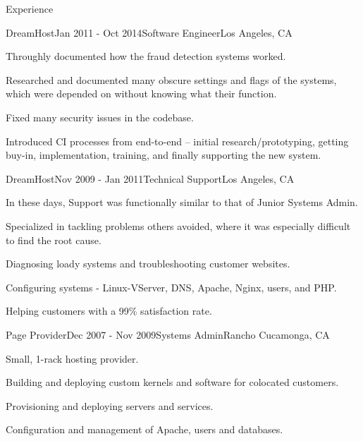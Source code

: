 \documentclass{resume} %
\begin{document}
\begin{rSection}{Experience}
\begin{rSubsection}{DreamHost}{Jan 2011 - Oct 2014}{Software Engineer}{Los Angeles, CA}
\item Throughly documented how the fraud detection systems worked.
\item Researched and documented many obscure settings and flags of the systems, which were depended on without knowing what their function.
\item Fixed many security issues in the codebase.
\item Introduced CI processes from end-to-end -- initial research/prototyping, getting buy-in, implementation, training, and finally supporting the new system.
\end{rSubsection}


\begin{rSubsection}{DreamHost}{Nov 2009 - Jan 2011}{Technical Support}{Los Angeles, CA}
\item In these days, Support was functionally similar to that of Junior Systems Admin.
\item Specialized in tackling problems others avoided, where it was especially difficult to find the root cause.
\item Diagnosing loady systems and troubleshooting customer websites.
\item Configuring systems - Linux-VServer, DNS, Apache, Nginx, users, and PHP.
\item Helping customers with a 99\% satisfaction rate.
\end{rSubsection}


\begin{rSubsection}{Page Provider}{Dec 2007 - Nov 2009}{Systems Admin}{Rancho Cucamonga, CA}
\item Small, 1-rack hosting provider.
\item Building and deploying custom kernels and software for colocated customers.
\item Provisioning and deploying servers and services.
\item Configuration and management of Apache, users and databases.
\end{rSubsection}

\end{rSection}

\end{document}
